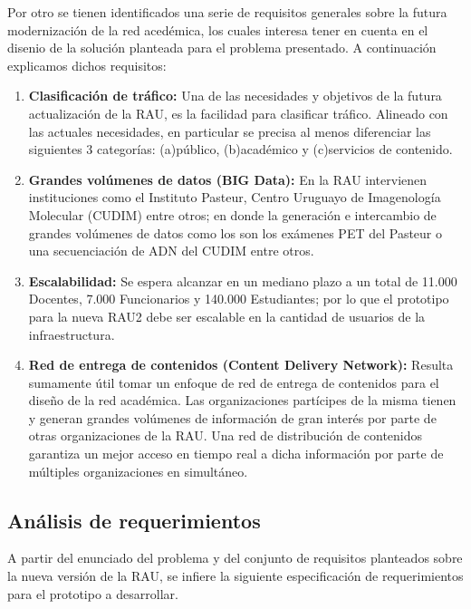 Por otro se tienen identificados una serie de requisitos generales sobre la futura modernizaci\'on de la red aced\'emica, los cuales interesa tener en cuenta en el disenio de la soluci\'on planteada para el problema presentado. A continuaci\'on explicamos dichos requisitos:

\begin{enumerate}
\item \textbf{Clasificación de tráfico:} Una de las necesidades y objetivos de la futura actualizaci\'on de la RAU, es la facilidad para clasificar tráfico. Alineado con las actuales necesidades, en particular se precisa al menos diferenciar las siguientes 3 categorías: (a)público, (b)académico y (c)servicios de contenido.

\item \textbf{Grandes volúmenes de datos (BIG Data):} En la RAU intervienen instituciones como el Instituto Pasteur, Centro Uruguayo de Imagenología Molecular (CUDIM) entre otros; en donde la generación e intercambio de grandes volúmenes de datos como los son los exámenes PET del Pasteur o una secuenciación de ADN del CUDIM entre otros.

\item \textbf{Escalabilidad:} Se espera alcanzar en un mediano plazo a un total de 11.000 Docentes, 7.000 Funcionarios y 140.000 Estudiantes; por lo que el prototipo para la nueva RAU2 debe ser escalable en la cantidad de usuarios de la infraestructura.

\item \textbf{Red de entrega de contenidos (Content Delivery Network):} Resulta sumamente útil tomar un enfoque de red de entrega de contenidos para el diseño de la red académica. Las organizaciones partícipes de la misma tienen y generan grandes volúmenes de información de gran interés por parte de otras organizaciones de la RAU. Una red de distribución de contenidos garantiza un mejor acceso en tiempo real a dicha información por parte de múltiples organizaciones en simultáneo. 
 
\end{enumerate}


\newpage
\subsection[An\'alisis de requerimientos]{An\'alisis de requerimientos}

A partir del enunciado del problema y del conjunto de requisitos planteados sobre la nueva versi\'on de la RAU, se infiere la siguiente especificaci\'on de requerimientos para el prototipo a desarrollar.


